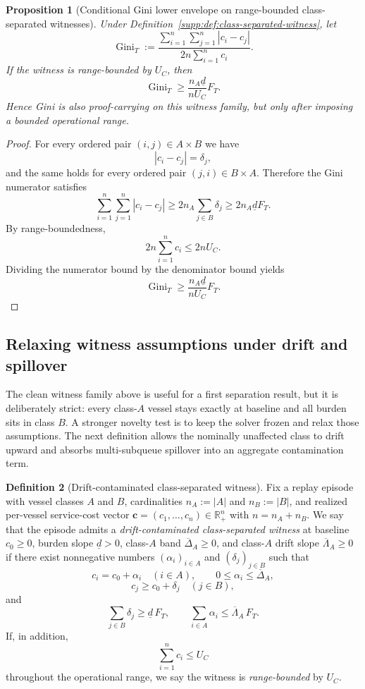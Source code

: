 \documentclass[11pt]{article}
\newcommand{\1}{\mathbf{1}}
\newcommand{\Gini}{\operatorname{Gini}}
\theoremstyle{definition}
\newtheorem{definition}{Definition}[section]
\theoremstyle{plain}
\newtheorem{proposition}[definition]{Proposition}
\theoremstyle{remark}
\begin{document}
\begin{proposition}[Conditional Gini lower envelope on range-bounded class-separated witnesses]
\label{supp:prop:gini-envelope}
Under Definition~\ref{supp:def:class-separated-witness}, let
\[
\Gini_T := \frac{\sum_{i=1}^n\sum_{j=1}^n |c_i-c_j|}{2n\sum_{i=1}^n c_i}.
\]
If the witness is range-bounded by $U_C$, then
\[
\Gini_T \ge \frac{n_A\underline d}{nU_C} F_T.
\]
Hence Gini is also proof-carrying on this witness family, but only after imposing a bounded operational range.
\end{proposition}

\begin{proof}
For every ordered pair $(i,j)\in A\times B$ we have
\[
|c_i-c_j| = \delta_j,
\]
and the same holds for every ordered pair $(j,i)\in B\times A$. Therefore the Gini numerator satisfies
\[
\sum_{i=1}^n\sum_{j=1}^n |c_i-c_j|
\ge 2n_A \sum_{j\in B}\delta_j
\ge 2n_A\underline d F_T.
\]
By range-boundedness,
\[
2n\sum_{i=1}^n c_i \le 2nU_C.
\]
Dividing the numerator bound by the denominator bound yields
\[
\Gini_T \ge \frac{n_A\underline d}{nU_C} F_T.
\]

\end{proof}

\subsection{Relaxing witness assumptions under drift and spillover}
\label{supp:subsec:relaxed-witnesses}

The clean witness family above is useful for a first separation result, but it is deliberately strict: every class-$A$ vessel stays exactly at baseline and all burden sits in class $B$. A stronger novelty test is to keep the solver frozen and relax those assumptions. The next definition allows the nominally unaffected class to drift upward and absorbs multi-subqueue spillover into an aggregate contamination term.

\begin{definition}[Drift-contaminated class-separated witness]
\label{supp:def:drift-contaminated-witness}
Fix a replay episode with vessel classes $A$ and $B$, cardinalities $n_A:=|A|$ and $n_B:=|B|$, and realized per-vessel service-cost vector $\mathbf c=(c_1,\dots,c_n)\in\mathbb R_+^n$ with $n=n_A+n_B$. We say that the episode admits a \emph{drift-contaminated class-separated witness} at baseline $c_0\ge 0$, burden slope $\underline d>0$, class-$A$ band $\overline\Delta_A\ge 0$, and class-$A$ drift slope $\overline\Lambda_A\ge 0$ if there exist nonnegative numbers $(\alpha_i)_{i\in A}$ and $(\delta_j)_{j\in B}$ such that
\[
c_i = c_0 + \alpha_i \quad (i\in A),
\qquad
0\le \alpha_i \le \overline\Delta_A,
\]
\[
c_j \ge c_0 + \delta_j \quad (j\in B),
\]
and
\[
\sum_{j\in B}\delta_j \ge \underline d\,F_T,
\qquad
\sum_{i\in A}\alpha_i \le \overline\Lambda_A\,F_T.
\]
If, in addition,
\[
\sum_{i=1}^n c_i \le U_C
\]
throughout the operational range, we say the witness is \emph{range-bounded} by $U_C$.
\end{definition}
\end{document}
